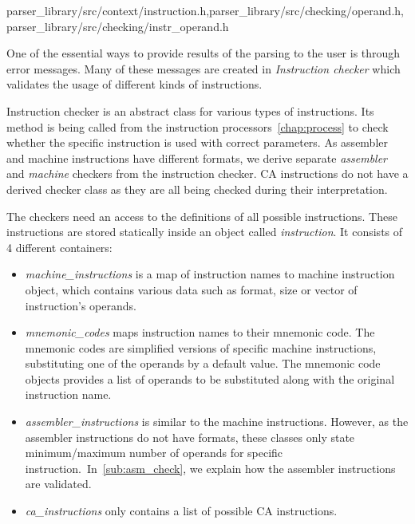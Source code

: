 {parser\_library/src/context/instruction.h,parser\_library/src/checking/operand.h,parser\_library/src/checking/instr\_operand.h}

\label{checker}
One of the essential ways to provide results of the parsing to the user is through error messages. Many of these messages are created in \emph{Instruction checker} which validates the usage of different kinds of instructions.

Instruction checker is an abstract class for various types of instructions. Its  method is being called from the instruction processors~\ref{chap:process} to check whether the specific instruction is used with correct parameters. As assembler and machine instructions have different formats, we derive separate \emph{assembler} and \emph{machine} checkers from the instruction checker. CA instructions do not have a derived checker class as they are all being checked during their interpretation.

The checkers need an access to the definitions of all possible instructions. These instructions are stored statically inside an object called \emph{instruction}. It consists of 4 different containers:
\begin{itemize}
	\item \emph{machine\_instructions} is a map of instruction names to machine instruction object, which contains various data such as format, size or vector of instruction's operands.
	\item \emph{mnemonic\_codes} maps instruction names to their mnemonic code. The mnemonic codes are simplified versions of specific machine instructions, substituting one of the operands by a default value. The mnemonic code objects provides a list of operands to be substituted along with the original instruction name.
	\item \emph{assembler\_instructions} is similar to the machine instructions. However, as the assembler instructions do not have formats, these classes only state minimum/maximum number of operands for specific instruction.~In~\cref{sub:asm_check}, we explain how the assembler instructions are validated.
	\item \emph{ca\_instructions} only contains a list of possible CA instructions.
\end{itemize}

